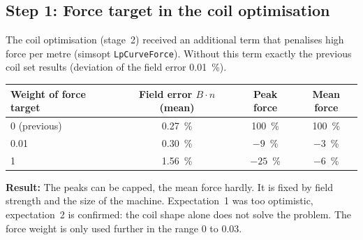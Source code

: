 \subsection*{Step 1: Force target in the coil optimisation}
The coil optimisation (stage~2) received an additional term that penalises high force per metre (simsopt
\texttt{LpCurveForce}). Without this term exactly the previous coil set results (deviation of the field error
\SI{0.01}{\%}).
\begin{center}\small
\begin{tabular}{lccc}
\toprule
Weight of force target & Field error $B\cdot n$ (mean) & Peak force & Mean force \\
\midrule
0 (previous) & 0.27~\% & 100~\% & 100~\% \\
0.01 & 0.30~\% & $-9$~\% & $-3$~\% \\
1 & 1.56~\% & $-25$~\% & $-6$~\% \\
\bottomrule
\end{tabular}
\end{center}
\textbf{Result:} The peaks can be capped, the mean force hardly. It is fixed by field strength and the size of the
machine. Expectation~1 was too optimistic, expectation~2 is confirmed: the coil shape alone does not solve the problem.
The force weight is only used further in the range 0 to 0.03.

